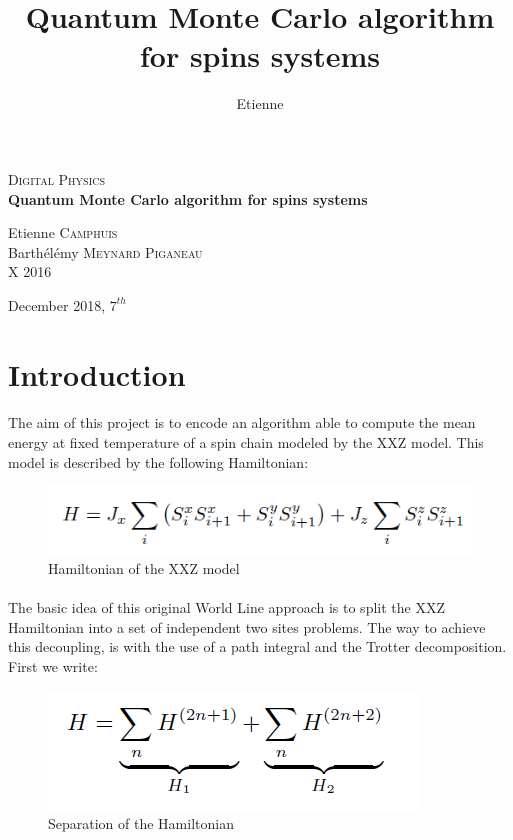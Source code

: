 \documentclass[a4paper,12pt]{article}
\title{Quantum Monte Carlo algorithm for spins systems}
\author{Etienne \bsc{Camphuis}}
\begin{document}
	\begin{titlepage}
		\begin{center}
			\textsc{\Large Digital Physics}\\[1.5cm]
			
			{ \huge \bfseries Quantum Monte Carlo algorithm for spins systems\\[0.4cm] }
		\vfill
		\begin{minipage}{0.4\textwidth}
			\large
			\centering
			Etienne \textsc{Camphuis}\\
			Barthélémy \textsc{Meynard Piganeau} \\
			X 2016\\
		\end{minipage}
		
		{\large December 2018, $7^{th}$}
		\end{center}
	\end{titlepage}

	\tableofcontents
	\newpage
	
	\section{Introduction}
	\paragraph{}The aim of this project is to encode an algorithm able to compute the mean energy at fixed temperature of a spin chain modeled by the XXZ model. This model is described by the following Hamiltonian:
	\begin{figure}[H]
		\centering
		\includegraphics[]{hamiltonian.png}
		\caption{Hamiltonian of the XXZ model}
		\label{hamiltonian}
	\end{figure}
	\paragraph{}The basic idea of this original World Line approach is to split the XXZ Hamiltonian into a set of independent two sites problems. The way to achieve	this decoupling, is with the use of a path integral and the Trotter decomposition.
	First we write:
	\begin{figure}[H]
		\centering
		\includegraphics[]{hamiltoniandecomp.png}
		\caption{Separation of the Hamiltonian}
		\label{hamiltoniandecomp}
	\end{figure}
\end{document}
